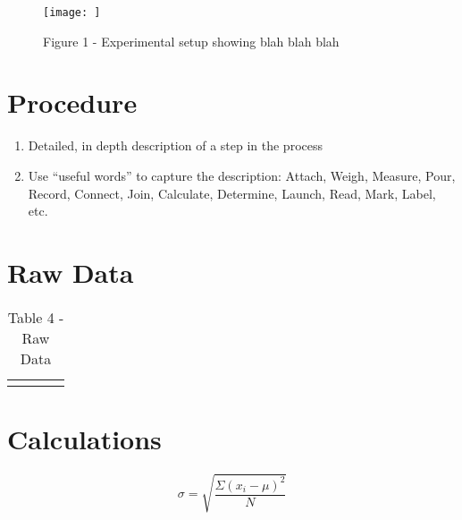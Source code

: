 \documentclass{lab}
\begin{document}
	\begin{figure}[H]
		\texttt{[image:   ]}
		\caption{Figure 1 - Experimental setup showing blah blah blah}
		\label{fig: setup}
	\end{figure}

	\section*{Procedure}
	\begin{enumerate}
                \vspace{-0.3cm}
                \itemsep-3pt
                \item Detailed, in depth description of a step in the process
		\item Use “useful words”  to capture the description: Attach, Weigh, Measure, Pour, Record, Connect, Join, Calculate, Determine, Launch, Read, Mark, Label, etc.
        \end{enumerate}

	\noindent\begin{minipage}{\textwidth}
        \section*{Raw Data}
        \vspace{-0.2cm}
	\renewcommand{\arraystretch}{1.1}
        \begin{table}[H]
            \centering
            \begin{tabular}{l|l|l|l}
		    \dtoprule
	    	    \dbottomrule
	    \end{tabular}
	    \caption{Table 4 - Raw Data}
	    \label{table: raw-data}
	\end{table}
	\end{minipage}

	\section*{Calculations}
	\[\sigma = \sqrt{\dfrac{\Sigma(x_i-\mu)^2}{N}}\]
\end{document}
